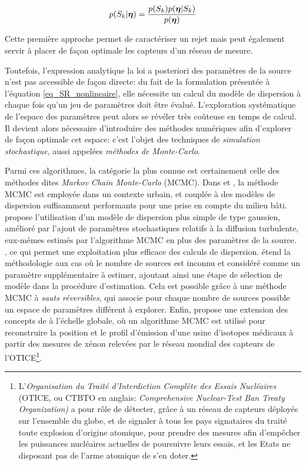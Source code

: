  \begin{equation}
 \label{eq_bayes_monte_carlo}
 p(S_k|{\bm{\eta}}) = \dfrac{p(S_k)p({\bm{\eta}} | S_k)}{p({\bm{\eta}})}
 \end{equation}
 
 Cette première approche permet de caractériser un rejet mais peut également servir à placer de façon optimale les capteurs d'un réseau de mesure.
 
 Toutefois, l'expression analytique la  loi a posteriori des paramètres de la source n'est  pas accessible de façon directe: du fait de la formulation présentée à l'équation \eqref{eq_SR_nonlineaire}, elle nécessite un calcul du modèle de dispersion à chaque fois qu'un jeu de paramètres doit être évalué. L'exploration systématique de l'espace des paramètres peut alors se révéler très coûteuse en temps de calcul. Il devient alors nécessaire d'introduire des méthodes numériques afin d'explorer de façon optimale cet espace: c'est l'objet des techniques de \textit{simulation stochastique}, aussi appelées \textit{méthodes de Monte-Carlo}.

 Parmi ces algorithmes, la catégorie la plus connue est certainement celle des méthodes dites \textit{Markov Chain Monte-Carlo} (MCMC). Dans \cite{Keats2007} et \cite{Chow2008}, la méthode MCMC est employée dans un contexte urbain, et couplée à des modèles de dispersion suffisamment performants pour une prise en compte du milieu bâti. \cite{Senocak2008} propose l'utilisation d'un modèle de dispersion plus simple de type gaussien, amélioré par l'ajout de paramètres stochastiques relatifs à la diffusion turbulente, eux-mêmes estimés par l'algorithme MCMC en plus des paramètres de la source. , ce qui permet une exploitation plus efficace des calculs de dispersion. \cite{Yee2008b} étend la méthodologie aux cas où le nombre de sources est inconnu et considéré comme un paramètre supplémentaire à estimer, ajoutant ainsi une étape de sélection de modèle dans la procédure d'estimation. Cela est possible grâce à une méthode MCMC à \textit{sauts réversibles}, qui associe pour chaque nombre de sources possible un espace de paramètres différent à explorer. Enfin, \cite{Yee2014} propose une extension des concepts de \cite{Keats2007} à l'échelle globale, où un algorithme MCMC est utilisé pour reconstruire la position et le profil d'émission d'une usine d'isotopes médicaux à partir des mesures de xénon relevées par le réseau mondial des capteurs de l'OTICE\footnote{L'\textit{Organisation du Traité d'Interdiction Complète des Essais Nucléaires} (OTICE, ou CTBTO en anglais: \textit{Comprehensive Nuclear-Test Ban Treaty Organization)} a pour rôle de détecter, grâce à un réseau de capteurs déployés sur l'ensemble du globe, et de signaler à tous les pays signataires du traité toute explosion d'origine atomique, pour prendre des mesures afin d'empêcher les puissances nucléaires actuelles de poursuivre leurs essais, et les Etats ne disposant pas de l'arme atomique de s'en doter.}. \\
 

